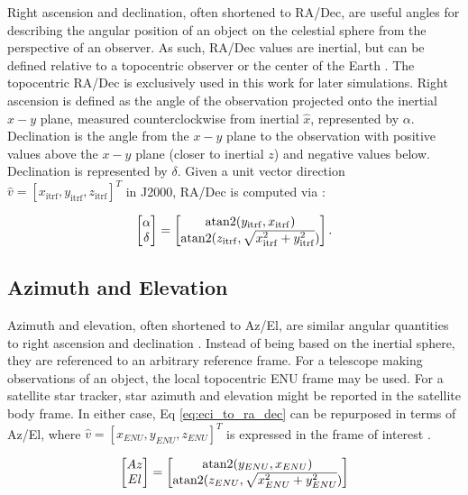 Right ascension and declination, often shortened to RA/Dec, are useful angles for describing the angular position of an object on the celestial sphere from the perspective of an observer. As such, RA/Dec values are inertial, but can be defined relative to a topocentric observer or the center of the Earth \cite{frueh2019notes}. The topocentric RA/Dec is exclusively used in this work for later simulations. Right ascension is defined as the angle
of the observation projected onto the inertial $x-y$ plane, measured counterclockwise from inertial
$\hat{x}$, represented by $\alpha$. Declination is the angle from the $x-y$ plane to the observation
with positive values above the $x-y$ plane (closer to inertial $z$) and negative values below.
Declination is represented by $\delta$. Given a unit vector direction $\hat{v} = \left[ x_\mathrm{itrf}, y_\mathrm{itrf}, z_\mathrm{itrf} \right]^T$ in J2000, RA/Dec is computed via \cite{frueh2019notes}:

\begin{equation} \label{eq:eci_to_ra_dec}
  \begin{bmatrix}
	\alpha \\
	\delta
  \end{bmatrix} = 
  \begin{bmatrix}
	\operatorname{atan2}(y_\mathrm{itrf}, x_\mathrm{itrf}) \\
	\operatorname{atan2}(z_\mathrm{itrf}, \sqrt{x_\mathrm{itrf}^2 + y_\mathrm{itrf}^2})
  \end{bmatrix}.
\end{equation}

\subsection{Azimuth and Elevation}

Azimuth and elevation, often shortened to Az/El, are similar angular quantities to right ascension and declination \cite{frueh2019notes}. Instead of being based on
the inertial sphere, they are referenced to an arbitrary reference frame. For a telescope making
observations of an object, the local topocentric ENU frame may be used. For a satellite star
tracker, star azimuth and elevation might be reported in the satellite body frame. In either case,
Eq \ref{eq:eci_to_ra_dec} can be repurposed in terms of Az/El, where $\hat{v} = \left[ x_{ENU}, y_{ENU}, z_{ENU}
\right]^T$ is expressed in the frame of interest \cite{frueh2019notes}.

\begin{equation} \label{eq:enu_to_az_el}
  \begin{bmatrix}
	Az \\
	El
  \end{bmatrix} = 
  \begin{bmatrix}
	\operatorname{atan2}(y_{ENU}, x_{ENU}) \\
	\operatorname{atan2}(z_{ENU}, \sqrt{x_{ENU}^2 + y_{ENU}^2})
  \end{bmatrix}
\end{equation}

